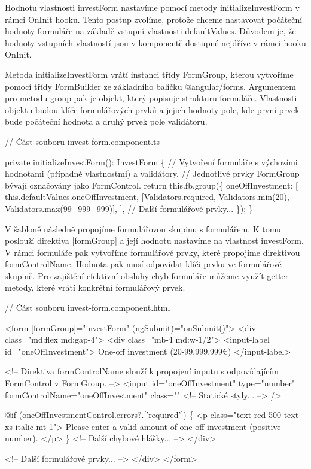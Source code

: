 Hodnotu vlastnosti investForm nastavíme pomocí metody initializeInvestForm v rámci OnInit hooku. 
Tento postup zvolíme, protože chceme nastavovat počáteční hodnoty formuláře na základě vstupní vlastnosti defaultValues.
Důvodem je, že hodnoty vstupních vlastností jsou v komponentě dostupné nejdříve v rámci hooku OnInit.

Metoda initializeInvestForm vrátí instanci třídy FormGroup, kterou vytvoříme pomocí třídy FormBuilder ze základního balíčku @angular/forms. 
Argumentem pro metodu group pak je objekt, který popisuje strukturu formuláře. 
Vlastnosti objektu budou klíče formulářových prvků a jejich hodnoty pole, kde první prvek bude počáteční hodnota a druhý prvek pole validátorů.

\begin{prog}
// Část souboru invest-form.component.ts

private initializeInvestForm(): InvestForm \{
  // Vytvoření formuláře s výchozími hodnotami 
    (případně vlastnostmi) a validátory.
  // Jednotlivé prvky FormGroup bývají označovány jako FormControl.
  return this.fb.group(\{
    oneOffInvestment: [
      this.defaultValues.oneOffInvestment,
      [Validators.required, Validators.min(20), Validators.max(99_999_999)],
    ],
    // Další formulářové prvky... 
  \});
\}
\end{prog}

V šabloně následně propojíme formulářovou skupinu s formulářem. K tomu poslouží direktiva [formGroup] a její hodnotu nastavíme na vlastnost investForm. 
V rámci formuláře pak vytvoříme formulářové prvky, které propojíme direktivou formControlName. Hodnota pak musí odpovídat klíči prvku ve formulářové skupině. 
Pro zajištění efektivní obsluhy chyb formuláře můžeme využít getter metody, které vrátí konkrétní formulářový prvek.

\begin{prog}
// Část souboru invest-form.component.html

<form [formGroup]="investForm" (ngSubmit)="onSubmit()">
  <div class="md:flex md:gap-4">
    <div class="mb-4 md:w-1/2">
      <input-label id="oneOffInvestment">
        One-off investment (20-99.999.999€)
      </input-label>

      <!-- Direktiva formControlName slouží k propojení inputu 
        s odpovídajícím FormControl v FormGroup. -->
      <input
        id="oneOffInvestment"
        type="number"
        formControlName="oneOffInvestment"
        class="" <!-- Statické styly... -->
      />

      @if (oneOffInvestmentControl.errors?.['required']) \{
        <p class="text-red-500 text-xs italic mt-1">
          Please enter a valid amount of one-off investment (positive number).
        </p>
      \}
      <!-- Další chybové hlášky... -->
    </div>

    <!-- Další formulářové prvky... -->
  </div>
</form>
\end{prog}

